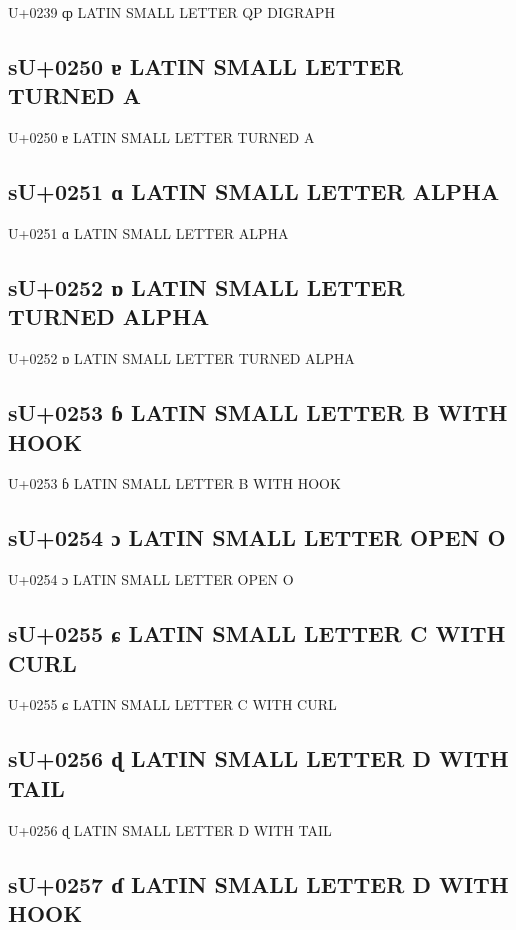 U+0239 ȹ LATIN SMALL LETTER QP DIGRAPH

\subsection{sU+0250 ɐ LATIN SMALL LETTER TURNED A}

U+0250 ɐ LATIN SMALL LETTER TURNED A

\subsection{sU+0251 ɑ LATIN SMALL LETTER ALPHA}

U+0251 ɑ LATIN SMALL LETTER ALPHA

\subsection{sU+0252 ɒ LATIN SMALL LETTER TURNED ALPHA}

U+0252 ɒ LATIN SMALL LETTER TURNED ALPHA

\subsection{sU+0253 ɓ LATIN SMALL LETTER B WITH HOOK}

U+0253 ɓ LATIN SMALL LETTER B WITH HOOK

\subsection{sU+0254 ɔ LATIN SMALL LETTER OPEN O}

U+0254 ɔ LATIN SMALL LETTER OPEN O

\subsection{sU+0255 ɕ LATIN SMALL LETTER C WITH CURL}

U+0255 ɕ LATIN SMALL LETTER C WITH CURL

\subsection{sU+0256 ɖ LATIN SMALL LETTER D WITH TAIL}

U+0256 ɖ LATIN SMALL LETTER D WITH TAIL

\subsection{sU+0257 ɗ LATIN SMALL LETTER D WITH HOOK}

